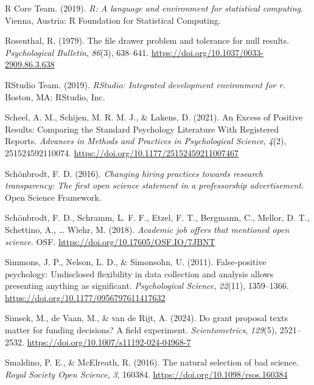 \documentclass[
  ,man,mask,floatsintext]{apa6}
\newlength{\cslhangindent}
\newlength{\cslentryspacingunit} %
\newenvironment{CSLReferences}[2] %
 {%
  \setlength{\parindent}{0pt}
  \ifodd #1
  \let\oldpar\par
  \def\par{\hangindent=\cslhangindent\oldpar}
  \fi
  \setlength{\parskip}{#2\cslentryspacingunit}
 }%
 {}
\begin{document}
\begin{CSLReferences}{1}{0}
\leavevmode{}%
R Core Team. (2019). \emph{R: {A} language and environment for statistical computing}. Vienna, Austria: R Foundation for Statistical Computing.

\leavevmode{}%
Rosenthal, R. (1979). The file drawer problem and tolerance for null results. \emph{Psychological Bulletin}, \emph{86}(3), 638--641. \url{https://doi.org/10.1037/0033-2909.86.3.638}

\leavevmode{}%
RStudio Team. (2019). \emph{{RStudio}: {Integrated} development environment for r}. Boston, MA: RStudio, Inc.

\leavevmode{}%
Scheel, A. M., Schijen, M. R. M. J., \& Lakens, D. (2021). An {Excess} of {Positive Results}: {Comparing} the {Standard Psychology Literature With Registered Reports}. \emph{Advances in Methods and Practices in Psychological Science}, \emph{4}(2), 251524592110074. \url{https://doi.org/10.1177/25152459211007467}

\leavevmode{}%
Schönbrodt, F. D. (2016). \emph{Changing hiring practices towards research transparency: {The} first open science statement in a professorship advertisement}. Open Science Framework.

\leavevmode{}%
Schönbrodt, F. D., Schramm, L. F. F., Etzel, F. T., Bergmann, C., Mellor, D. T., Schettino, A., \ldots{} Wiehr, M. (2018). \emph{Academic job offers that mentioned open science}. OSF. \url{https://doi.org/10.17605/OSF.IO/7JBNT}

\leavevmode{}%
Simmons, J. P., Nelson, L. D., \& Simonsohn, U. (2011). False-positive psychology: {Undisclosed} flexibility in data collection and analysis allows presenting anything as significant. \emph{Psychological Science}, \emph{22}(11), 1359--1366. \url{https://doi.org/10.1177/0956797611417632}

\leavevmode{}%
Simsek, M., de Vaan, M., \& van de Rijt, A. (2024). Do grant proposal texts matter for funding decisions? {A} field experiment. \emph{Scientometrics}, \emph{129}(5), 2521--2532. \url{https://doi.org/10.1007/s11192-024-04968-7}

\leavevmode{}%
Smaldino, P. E., \& McElreath, R. (2016). The natural selection of bad science. \emph{Royal Society Open Science}, \emph{3}, 160384. \url{https://doi.org/10.1098/rsos.160384}


\end{CSLReferences}
\end{document}
